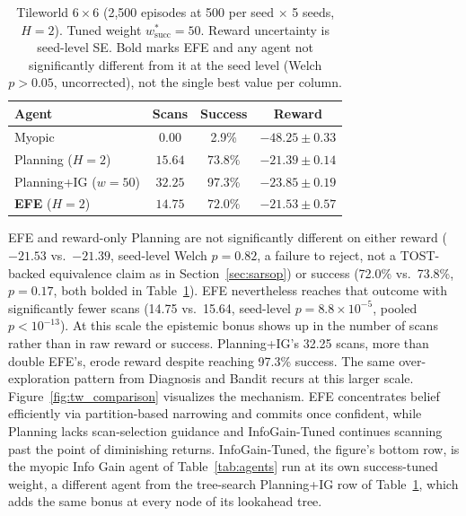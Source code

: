 \begin{table}[ht]
\centering
\caption{Tileworld $6{\times}6$ (2{,}500 episodes at 500 per seed $\times$ 5 seeds, $H{=}2$). Tuned weight $w^*_{\mathrm{succ}}{=}50$. Reward uncertainty is seed-level SE. Bold marks EFE and any agent not significantly different from it at the seed level (Welch $p > 0.05$, uncorrected), not the single best value per column.}
\label{tab:tileworld}
\begin{tablebody}
\begin{tabular}{lccc}
\toprule
Agent & Scans & Success & Reward \\
\midrule
Myopic & $0.00$ & 2.9\% & $-48.25 \pm 0.33$ \\
Planning ($H{=}2$) & $15.64$ & $\mathbf{73.8\%}$ & $\mathbf{-21.39 \pm 0.14}$ \\
Planning+IG ($w{=}50$) & $32.25$ & 97.3\% & $-23.85 \pm 0.19$ \\
\textbf{EFE} ($H{=}2$) & $\mathbf{14.75}$ & $\mathbf{72.0\%}$ & $\mathbf{-21.53 \pm 0.57}$ \\
\bottomrule
\end{tabular}
\end{tablebody}
\end{table}

EFE and reward-only Planning are not significantly different on either reward ($-21.53$ vs.\ $-21.39$, seed-level Welch $p{=}0.82$, a failure to reject, not a TOST-backed equivalence claim as in Section~\ref{sec:sarsop}) or success (72.0\% vs.\ 73.8\%, $p{=}0.17$, both bolded in Table~\ref{tab:tileworld}). EFE nevertheless reaches that outcome with significantly fewer scans (14.75 vs.\ 15.64, seed-level $p{=}8.8{\times}10^{-5}$, pooled $p<10^{-13}$). At this scale the epistemic bonus shows up in the number of scans rather than in raw reward or success. Planning+IG's 32.25 scans, more than double EFE's, erode reward despite reaching 97.3\% success. The same over-exploration pattern from Diagnosis and Bandit recurs at this larger scale. Figure~\ref{fig:tw_comparison} visualizes the mechanism. EFE concentrates belief efficiently via partition-based narrowing and commits once confident, while Planning lacks scan-selection guidance and InfoGain-Tuned continues scanning past the point of diminishing returns. InfoGain-Tuned, the figure's bottom row, is the myopic Info Gain agent of Table~\ref{tab:agents} run at its own success-tuned weight, a different agent from the tree-search Planning+IG row of Table~\ref{tab:tileworld}, which adds the same bonus at every node of its lookahead tree.

